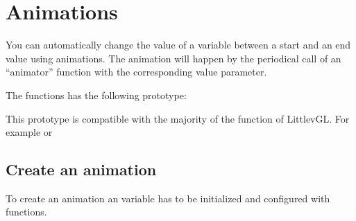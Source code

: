 \documentclass[letterpaper,10pt,english]{sphinxmanual}
\begin{document}
\section{Animations}
\label{\detokenize{overview/animations:animations}}\label{\detokenize{overview/animations::doc}}
You can automatically change the value of a variable between a start and an end value using animations.
The animation will happen by the periodical call of an “animator” function with the corresponding value parameter.

The  functions has the following prototype:

\begin{sphinxVerbatim}[commandchars=\\\{\}]
     
\end{sphinxVerbatim}

This prototype is compatible with the majority of the  function of LittlevGL. For example  or 


\subsection{Create an animation}
\label{\detokenize{overview/animations:create-an-animation}}
To create an animation an  variable has to be initialized and configured with  functions.
\end{document}
